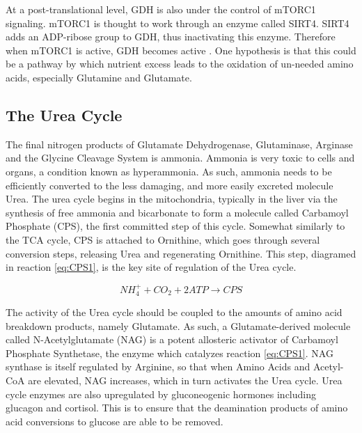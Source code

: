\documentclass{tufte-handout}
\begin{document}
At a post-translational level, GDH is also under the control of mTORC1 signaling.  mTORC1 is thought to work through an enzyme called SIRT4.  SIRT4 adds an ADP-ribose group to GDH, thus inactivating this enzyme.  Therefore when mTORC1 is active, GDH becomes active \citep{Csibi2013}.  One hypothesis is that this could be a pathway by which nutrient excess leads to the oxidation of un-needed amino acids, especially Glutamine and Glutamate.

\subsection{The Urea Cycle}

The final nitrogen products of Glutamate Dehydrogenase, Glutaminase, Arginase and the Glycine Cleavage System is ammonia.  Ammonia is very toxic to cells and organs, a condition known as hyperammonia.  As such, ammonia needs to be efficiently converted to the less damaging, and more easily excreted molecule Urea.  The urea cycle begins in the mitochondria, typically in the liver via the synthesis of free ammonia and bicarbonate to form a molecule called Carbamoyl Phosphate (CPS), the first committed step of this cycle.  Somewhat similarly to the TCA cycle, CPS is attached to Ornithine, which goes through several conversion steps, releasing Urea and regenerating Ornithine.  This step, diagramed in reaction \ref{eq:CPS1}, is the key site of regulation of the Urea cycle.

\begin{equation}\label{eq:CPS1}
 NH_4^+ + CO_2 + 2 ATP \rightarrow  CPS
\end{equation}

  The activity of the Urea cycle should be coupled to the amounts of amino acid breakdown products, namely Glutamate.  As such, a Glutamate-derived molecule called N-Acetylglutamate (NAG) is a potent allosteric activator of Carbamoyl Phosphate Synthetase, the enzyme which catalyzes reaction \ref{eq:CPS1}.  NAG synthase is itself regulated by Arginine, so that when Amino Acids and Acetyl-CoA are elevated, NAG increases, which in turn activates the Urea cycle.  Urea cycle enzymes are also upregulated by gluconeogenic hormones including glucagon and cortisol.  This is to ensure that the deamination products of amino acid conversions to glucose are able to be removed.
\end{document}
